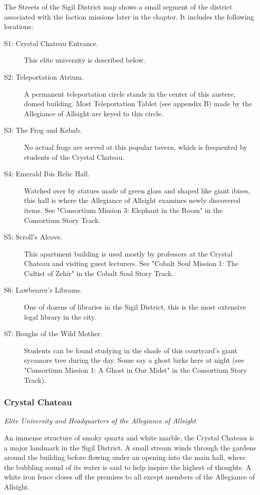 \documentclass[10pt,a4paper,twoside,bg=print,twocolumn,openany,nodeprecatedcode]{dndbook}
\begin{document}
The Streets of the Sigil District map shows a small segment of the district associated with the faction missions later in the chapter. It includes the following locations:


\begin{description}
\item[S1: Crystal Chateau Entrance.]
This elite university is described below.
\item[S2: Teleportation Atrium.]
A permanent teleportation circle stands in the center of this austere, domed building. Most Teleportation Tablet (see appendix B) made by the Allegiance of Allsight are keyed to this circle.
\item[S3: The Frog and Kebab.]
No actual frogs are served at this popular tavern, which is frequented by students of the Crystal Chateau.
\item[S4: Emerald Ibis Relic Hall.]
Watched over by statues made of green glass and shaped like giant ibises, this hall is where the Allegiance of Allsight examines newly discovered items. See "Consortium Mission 3: Elephant in the Room" in the Consortium Story Track.
\item[S5: Scroll's Alcove.]
This apartment building is used mostly by professors at the Crystal Chateau and visiting guest lecturers. See "Cobalt Soul Mission 1: The Cultist of Zehir" in the Cobalt Soul Story Track.
\item[S6: Lawbearer's Librams.]
One of dozens of libraries in the Sigil District, this is the most extensive legal library in the city.
\item[S7: Boughs of the Wild Mother.]
Students can be found studying in the shade of this courtyard's giant sycamore tree during the day. Some say a ghost lurks here at night (see "Consortium Mission 1: A Ghost in Our Midst" in the Consortium Story Track).
\end{description}

\subsubsection{Crystal Chateau}
\textit{Elite University and Headquarters of the Allegiance of Allsight}

An immense structure of smoky quartz and white marble, the Crystal Chateau is a major landmark in the Sigil District. A small stream winds through the gardens around the building before flowing under an opening into the main hall, where the bubbling sound of its water is said to help inspire the highest of thoughts. A white iron fence closes off the premises to all except members of the Allegiance of Allsight.
\end{document}
